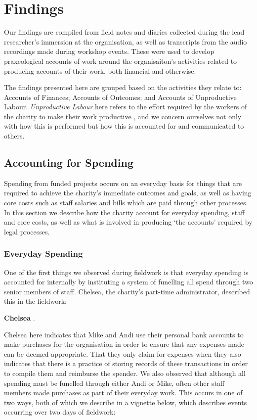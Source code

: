 \section{Findings}
Our findings are compiled from field notes and diaries collected during the lead researcher's immersion at the organisation, as well as transcripts from the audio recordings made during workshop events. These were used to develop praxeological accounts of work \cite{crabtree_doing_2012} around the organisaiton's activities related to producing accounts of their work, both financial and otherwise.

The findings presented here are grouped based on the activities they relate to: Accounts of Finances; Accounts of Outcomes; and Accounts of Unproductive Labour. \textit{Unproductive Labour} here refers to the effort required by the workers of the charity to make their work productive \cite{marx_contribution_1970}, and we concern ourselves not only with how this is performed but how this is accounted for and communicated to others.

\subsection{Accounting for Spending}
Spending from funded projects occurs on an everyday basis for things that are required to achieve the charity's immediate outcomes and goals, as well as having core costs such as staff salaries and bills which are paid through other processes. In this section we describe how the charity account for everyday spending, staff and core costs, as well as what is involved in producing `the accounts' required by legal processes.

\subsubsection{Everyday Spending}
One of the first things we observed during fieldwork is that everyday spending is accounted for internally by instituting a system of funelling all spend through two senior members of staff. Chelsea, the charity's part-time administrator, described this in the fieldwork:

\textbf{Chelsea} .

Chelsea here indicates that Mike and Andi use their personal bank accounts to make purchases for the organisation in order to ensure that any expenses made can be deemed appropriate. That they only claim for expenses when they  also indicates that there is a practice of storing records of these transactions in order to compile them and reimburse the spender. We also observed that although all spending must be funelled through either Andi or Mike, often other staff members made purchases as part of their everyday work. This occurs in one of two ways, both of which we describe in a vignette below, which describes events occurring over two days of fieldwork:

